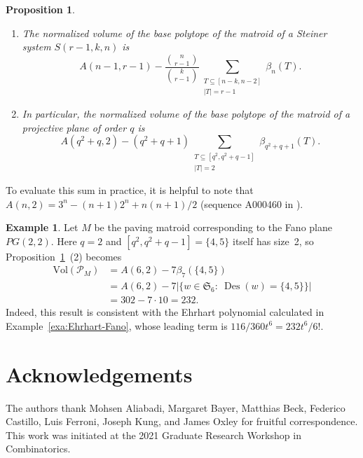 \documentclass[11pt]{amsart}
\newtheorem{proposition}[theorem]{Proposition}
\theoremstyle{definition}
\newtheorem{example}[theorem]{Example}
\newcommand{\0}{\emptyset}
\newcommand{\Vol}{\mathrm{Vol}}
\DeclareMathOperator{\Des}{Des}
\newcommand{\Sym}{\mathfrak{S}}
\begin{document}
\begin{proposition} \label{prop:Steiner-volume}
\begin{enumerate}
\item The normalized volume of the base polytope of the matroid of a Steiner system $S(r-1,k,n)$ is
\[
A(n-1,r-1) - \frac{\binom{n}{r-1}}{\binom{k}{r-1}} \sum_{\substack{T \subseteq [n-k,n-2] \\ |T| = r-1}} \beta_n(T).
\]
\item In particular, the normalized volume of the base polytope of the matroid of a projective plane of order $q$ is
\[
A(q^2+q,2) - (q^2+q+1) \sum_{\substack{T \subseteq [q^2,q^2+q-1] \\ |T| = 2}} \beta_{q^2+q+1}(T).
\]
\end{enumerate}
\end{proposition}


To evaluate this sum in practice, it is helpful to note that $A(n,2)=3^n - (n+1)2^n + n(n+1)/2$ (sequence A000460 in \cite{OEIS}).


\begin{example} \label{volume-Fan}
Let $M$ be the paving matroid corresponding to the Fano plane $PG(2,2)$.  Here $q=2$ and $[q^2,q^2+q-1]=\{4,5\}$ itself has size~2, so Proposition~\ref{prop:Steiner-volume}~(2) becomes
\begin{align*}
\Vol(\mathcal{P}_M) &= A(6,2) - 7\beta_7(\{4,5\})\\
&= A(6,2)-7\Big|\big\{w\in\Sym_6:\ \Des(w)=\{4,5\}\big\}\Big|\\
&= 302 - 7\cdot10 = 232.
\end{align*}
Indeed, this result is consistent with the Ehrhart polynomial calculated in Example~\ref{exa:Ehrhart-Fano}, whose leading term is $116/360t^6 = 232t^6/6!$.
\end{example}



\section*{Acknowledgements}

The authors thank Mohsen Aliabadi, Margaret Bayer, Matthias Beck, Federico Castillo, Luis Ferroni, Joseph Kung, and James Oxley for fruitful correspondence.
This work was initiated at the 2021 Graduate Research Workshop in Combinatorics.



\end{document}
